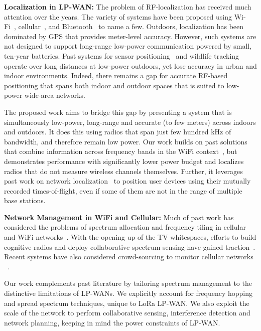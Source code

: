 \noindent \textbf{Localization in LP-WAN: } The problem of RF-localization has received much attention over the years. The variety of systems have been proposed using Wi-Fi~\cite{kumar2014accurate,vasisht2016decimeter, xiong2013arraytrack}, cellular~\cite{kumar2014lte,sun2005signal}, and Bluetooth~\cite{Kalliola2006, lazik2015alps, bargh2008indoor} to name a few. Outdoors, localization has been dominated by GPS that provides meter-level accuracy. However, such systems are not designed to support long-range low-power communication powered by small, ten-year batteries. Past systems for sensor positioning~\cite{sichitiu2004localization, gholami2013rss} and wildlife tracking~\cite{andrade2011reverse, maccurdy2009automatic} operate over long distances at low-power outdoors, yet lose accuracy in urban and indoor environments. Indeed, there remains a gap for  accurate RF-based positioning  that spans both indoor and outdoor spaces that is suited to low-power wide-area networks. 

The proposed work aims to bridge this gap by presenting a system that is simultaneously low-power, long-range and accurate (to few meters) across indoors and outdoors. It does this using radios that span just few hundred kHz of bandwidth, and therefore remain low power. Our work builds on past solutions that combine information across frequency bands in the WiFi context~\cite{vasisht2016decimeter}, but demonstrates performance with significantly lower power budget and localizes radios that do not measure wireless channels themselves. Further, it leverages past work on network localization~\cite{nwlocalization,sethnwlocalization} to position user devices using their mutually recorded times-of-flight, even if some of them are not in the range of multiple base stations.  \\\vspace*{-0.1in}

\noindent \textbf{Network Management in WiFi and Cellular: } Much of past work has considered the problems of spectrum allocation and frequency tiling in cellular~\cite{mcdiarmid2000channel, khanna1998wireless} and WiFi networks~\cite{baid2015understanding, mishra2005weighted}. With the opening up of the TV whitespaces, efforts to build cognitive radios and deploy collaborative spectrum sensing have gained traction~\cite{yucek2009survey, nekovee2010cognitive}. Recent systems have also considered crowd-sourcing to  monitor cellular networks ~\cite{fatemieh2010secure, shi2014crowdsourcing}. 

Our work complements past literature by tailoring spectrum management to the distinctive limitations of LP-WANs. We explicitly account for frequency hopping and spread spectrum techniques, unique to LoRa LP-WAN. We also exploit the scale of the network to perform collaborative sensing, interference detection and network planning, keeping in mind the power constraints of LP-WAN. 

